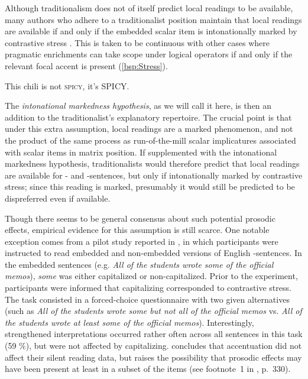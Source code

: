 \documentclass[fleqn,reqno,10pt,draft]{article}
\newcommand{\as}{\acro{as}}
\renewcommand{\es}{\acro{es}}
\begin{document}
Although traditionalism does not of itself predict local readings to
be available, many authors who adhere to a traditionalist position
maintain that local readings are available if and only if the
embedded scalar item is intonationally marked by contrastive stress
\citep[e.g.][]{Horn2006:The-Border-Wars,Geurts2009:Scalar-Implicat,Geurts2010:Quantity-Implic,GeurtsTielvan-Tiel2013:Scalar-expressi}. This
is taken to be continuous with other cases where pragmatic enrichments
can take scope under logical operators if and only if the relevant
focal accent is present (\ref{bsp:Stress}).

\begin{exe}
\ex \label{bsp:Stress} This chili is not \textsc{spicy}, it's \textsc{SPICY}.
\end{exe}

\noindent The \emph{intonational markedness hypothesis}, as we will
call it here, is then an addition to the traditionalist's explanatory
repertoire. The crucial point is that under this extra assumption,
local readings are a marked phenomenon, and not the product of the
same process as run-of-the-mill scalar implicatures associated with
scalar items in matrix position. If supplemented with the intonational
markedness hypothesis, traditionalists would therefore predict that
local readings are available for \as- and \es-sentences, but only if
intonationally marked by contrastive stress; since this reading is
marked, presumably it would still be predicted to be dispreferred even
if available.

Though there seems to be general consensus about such potential
prosodic effects, empirical evidence for this assumption is still
scarce. One notable exception comes from a pilot study reported in
\citet{Frazier08}, in which participants were instructed to read
embedded and non-embedded versions of English \as-sentences. In the
embedded sentences (e.g. {\it All of the students wrote some of the
  official memos}), {\it some} was either capitalized or
non-capitalized. Prior to the experiment, participants were informed
that capitalizing corresponded to contrastive stress. The task
consisted in a forced-choice questionnaire with two given alternatives
(such as {\it All of the students wrote some but not all of the
  official memos} vs. {\it All of the students wrote at least some of
  the official memos}). Interestingly, strengthened interpretations
occurred rather often across all sentences in this task (59 \%), but
were not affected by capitalizing.
\citeauthor{Frazier08} concludes that accentuation did not affect
their silent reading data, but raises the possibility that prosodic
effects may have been present at least in a subset of the items (see
footnote~1 in \citet{Frazier08}, p.~330).
\end{document}
